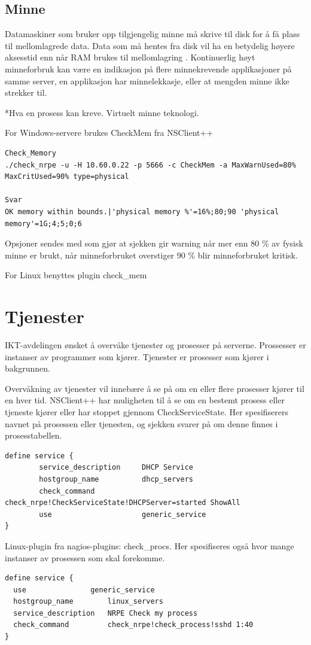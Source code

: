 \subsection{Minne}
Datamaskiner som bruker opp tilgjengelig minne må skrive til disk for å få plass til mellomlagrede data. Data som må hentes fra disk vil ha en betydelig høyere aksesstid enn når RAM brukes til mellomlagring \cite{wiki:mem}. 
Kontinuerlig høyt minneforbruk kan være en indikasjon på flere minnekrevende applikasjoner på samme server, en applikasjon har minnelekkasje, eller at mengden minne ikke strekker til.

*Hva en prosess kan kreve. Virtuelt minne teknologi.

For Windows-servere brukes CheckMem fra NSClient++
\begin{lstlisting}
Check_Memory
./check_nrpe -u -H 10.60.0.22 -p 5666 -c CheckMem -a MaxWarnUsed=80% MaxCritUsed=90% type=physical

Svar
OK memory within bounds.|'physical memory %'=16%;80;90 'physical memory'=1G;4;5;0;6
\end{lstlisting}

Opsjoner sendes med som gjør at sjekken gir warning når mer enn 80 \% av fysisk minne er brukt, når minneforbruket overstiger 90 \% blir minneforbruket kritisk.

For Linux benyttes plugin check\_mem \cite{checklinuxmem}

\section{Tjenester}
IKT-avdelingen ønsket å overvåke tjenester og prosesser på serverne. Prossesser er instanser av programmer som kjører. Tjenester er prosesser som kjører i bakgrunnen. 

Overvåkning av tjenester vil innebære å se på om en eller flere prosesser kjører til en hver tid. NSClient++ har muligheten til å se om en bestemt prosess eller tjeneste kjører eller har stoppet gjennom CheckServiceState. Her spesifiserers navnet på prosessen eller tjenesten, og sjekken svarer på om denne finnes i prosesstabellen.
\begin{lstlisting}
define service {
        service_description     DHCP Service
        hostgroup_name          dhcp_servers
        check_command           check_nrpe!CheckServiceState!DHCPServer=started ShowAll
        use                     generic_service
}
\end{lstlisting}
Linux-plugin fra nagios-plugins: check\_procs. Her spesifiseres også hvor mange instanser av prosessen som skal forekomme. 
\begin{lstlisting}
define service {
  use            	generic_service
  hostgroup_name       	linux_servers
  service_description   NRPE Check my process
  check_command        	check_nrpe!check_process!sshd 1:40
}
\end{lstlisting}

